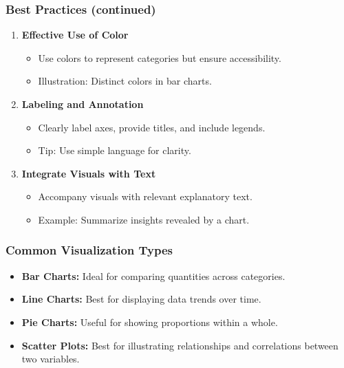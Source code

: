 \documentclass[aspectratio=169]{beamer}
\begin{document}
\begin{frame}[fragile]
    \frametitle{Best Practices (continued)}
    \begin{enumerate}[resume]
        \item \textbf{Effective Use of Color}
        \begin{itemize}
            \item Use colors to represent categories but ensure accessibility.
            \item Illustration: Distinct colors in bar charts.
        \end{itemize}

        \item \textbf{Labeling and Annotation}
        \begin{itemize}
            \item Clearly label axes, provide titles, and include legends.
            \item Tip: Use simple language for clarity.
        \end{itemize}

        \item \textbf{Integrate Visuals with Text}
        \begin{itemize}
            \item Accompany visuals with relevant explanatory text.
            \item Example: Summarize insights revealed by a chart.
        \end{itemize}
    \end{enumerate}
\end{frame}

\begin{frame}[fragile]
    \frametitle{Common Visualization Types}
    \begin{itemize}
        \item \textbf{Bar Charts:} Ideal for comparing quantities across categories.
        \item \textbf{Line Charts:} Best for displaying data trends over time.
        \item \textbf{Pie Charts:} Useful for showing proportions within a whole.
        \item \textbf{Scatter Plots:} Best for illustrating relationships and correlations between two variables.
    \end{itemize}
\end{frame}
\end{document}
